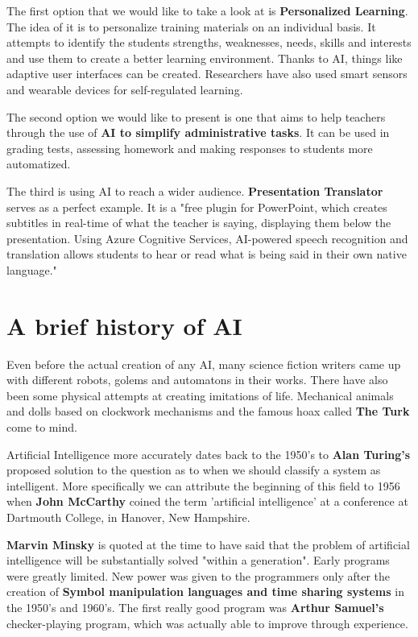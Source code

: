 \documentclass[10pt,a4paper,]{article}
\begin{document}
The first option that we would like to take a look at is \textbf{Personalized Learning}. The idea of it is to personalize training materials on an individual basis. It attempts to identify the students strengths, weaknesses, needs, skills and interests and use them to create a better learning environment. Thanks to AI, things like adaptive user interfaces can be created\cite{Jiming2003}. Researchers have also used smart sensors and wearable devices for self-regulated learning\cite{Ciolacu2018}.

The second option we would like to present is one that aims to help teachers through the use of \textbf{AI to simplify administrative tasks}. It can be used in grading tests, assessing homework\cite{LLAMASNISTAL2013} and making responses to students more automatized\cite{Park2019}.

The third is using AI to reach a wider audience. \textbf{Presentation Translator} serves as a perfect example. It is a "free plugin for PowerPoint, which creates subtitles in real-time of what the teacher is saying, displaying them below the presentation. Using Azure Cognitive Services, AI-powered speech recognition and translation allows students to hear or read what is being said in their own native language."\cite{McNeill2018}

\section{A brief history of AI} \label{history}

Even before the actual creation of any AI, many science fiction writers came up with different robots, golems and automatons in their works. There have also been some physical attempts at creating imitations of life. Mechanical animals and dolls based on clockwork mechanisms and the famous hoax called \textbf{The Turk} come to mind.\cite{Buchanan2005}

Artificial Intelligence more accurately dates back to the 1950's to \textbf{Alan Turing's} proposed solution to the question as to when we should classify a system as intelligent. More specifically we can attribute the beginning of this field to 1956 when \textbf{John McCarthy} coined the term 'artificial intelligence' at a conference at Dartmouth College, in Hanover, New Hampshire.\cite{Popenici2017}

\textbf{Marvin Minsky} is quoted at the time to have said that the problem of artificial intelligence will be substantially solved "within a generation". Early programs were greatly limited. New power was given to the programmers only after the creation of \textbf{Symbol manipulation languages and time sharing systems} in the 1950's and 1960's. The first really good program was \textbf{Arthur Samuel's} checker-playing program, which was actually able to improve through experience.\cite{Buchanan2005}
\end{document}
